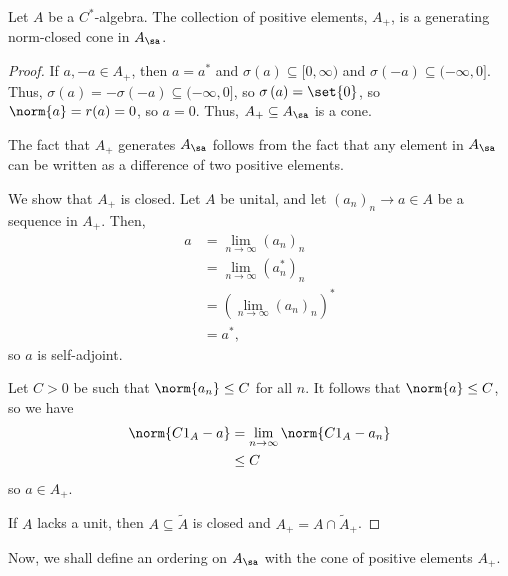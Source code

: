 \documentclass[10pt]{mypackage}
\begin{document}
\begin{corollary}
  Let $A$ be a $C^{\ast}$-algebra. The collection of positive elements, $A_{+}$, is a generating norm-closed cone in $A_{\sa}$.
\end{corollary}
\begin{proof}
  If $a,-a\in A_{+}$, then $a = a^{\ast}$ and $\sigma\left(a\right)\subseteq [0,\infty)$ and $\sigma\left(-a\right) \subseteq (-\infty,0]$. Thus, $\sigma\left(a\right) = -\sigma\left(-a\right)\subseteq (-\infty,0]$, so $\sigma\left(a\right) = \set{0}$, so $\norm{a} = r(a) = 0$, so $a = 0$. Thus, $A_{+}\subseteq A_{\sa}$ is a cone.\newline

  The fact that $A_{+}$ generates $A_{\sa}$ follows from the fact that any element in $A_{\sa}$ can be written as a difference of two positive elements.\newline

  We show that $A_{+}$ is closed. Let $A$ be unital, and let $\left(a_n\right)_n\rightarrow a\in A$  be a sequence in $A_{+}$. Then,
  \begin{align*}
    a &= \lim_{n\rightarrow\infty}\left(a_n\right)_n\\
      &= \lim_{n\rightarrow\infty}\left(a_n^{\ast}\right)_n\\
      &= \left(\lim_{n\rightarrow\infty}\left(a_n\right)_n\right)^{\ast}\\
      &= a^{\ast},
  \end{align*}
  so $a$ is self-adjoint.\newline

  Let $C > 0$ be such that $\norm{a_n}\leq C$ for all $n$. It follows that $\norm{a}\leq C$, so we have
  \begin{align*}
    \norm{C1_A - a} &= \lim_{n\rightarrow\infty}\norm{C1_A - a_n}\\
                    &\leq C
  \end{align*}
  so $a\in A_+$.\newline

  If $A$ lacks a unit, then $A\subseteq \widetilde{A}$ is closed and $A_+ = A\cap \widetilde{A}_+$.
\end{proof}
Now, we shall define an ordering on $A_{\sa}$ with the cone of positive elements $A_{+}$.
\end{document}
